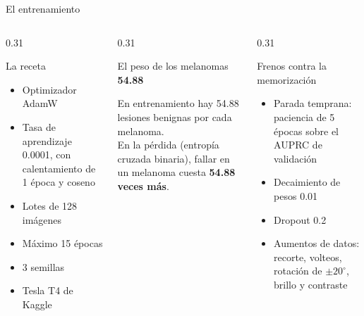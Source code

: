 \documentclass[aspectratio=169,10pt]{beamer}
\newcommand{\cifra}[1]{{\fontsize{24}{26}\selectfont\bfseries\color{azulfi}#1}}
\begin{document}
\begin{frame}{El entrenamiento}
  \begin{columns}[T]
    \begin{column}{0.31\textwidth}
      \begin{block}{La receta}
        \begin{itemize}
          \item Optimizador AdamW
          \item Tasa de aprendizaje 0.0001, con calentamiento de 1 época y coseno
          \item Lotes de 128 imágenes
          \item Máximo 15 épocas
          \item 3 semillas
          \item Tesla T4 de Kaggle
        \end{itemize}
      \end{block}
    \end{column}
    \begin{column}{0.31\textwidth}
      \begin{exampleblock}{El peso de los melanomas}
        \centering
        \cifra{54.88}\\[0.3em]
        \raggedright
        En entrenamiento hay 54.88 lesiones benignas por cada melanoma.\\[0.3em]
        En la pérdida (entropía cruzada binaria), fallar en un melanoma cuesta \textbf{54.88 veces más}.
      \end{exampleblock}
    \end{column}
    \begin{column}{0.31\textwidth}
      \begin{block}{Frenos contra la memorización}
        \begin{itemize}
          \item Parada temprana: paciencia de 5 épocas sobre el AUPRC de validación
          \item Decaimiento de pesos 0.01
          \item Dropout 0.2
          \item Aumentos de datos: recorte, volteos, rotación de $\pm 20^{\circ}$, brillo y contraste
        \end{itemize}
      \end{block}
    \end{column}
  \end{columns}
\end{frame}
\end{document}

